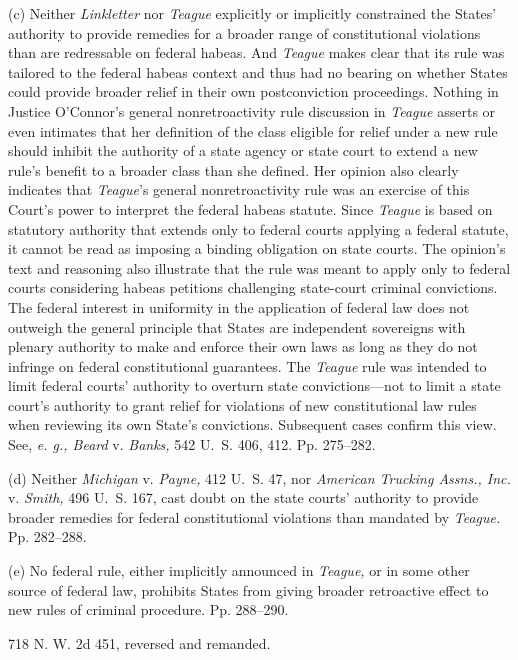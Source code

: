   (c) Neither \emph{Linkletter} nor \emph{Teague} explicitly or implicitly constrained the States' authority to provide remedies for a broader range of constitutional violations than are redressable on federal habeas. And \emph{Teague} makes clear that its rule was tailored to the federal habeas context and thus had no bearing on whether States could provide broader relief in their own postconviction proceedings. Nothing in Justice O'Connor's general nonretroactivity rule discussion in \emph{Teague} asserts or even intimates that her definition of the class eligible for relief under a new rule \newpage  should inhibit the authority of a state agency or state court to extend a new rule's benefit to a broader class than she defined. Her opinion also clearly indicates that \emph{Teague}'s general nonretroactivity rule was an exercise of this Court's power to interpret the federal habeas statute. Since \emph{Teague} is based on statutory authority that extends only to federal courts applying a federal statute, it cannot be read as imposing a binding obligation on state courts. The opinion's text and reasoning also illustrate that the rule was meant to apply only to federal courts considering habeas petitions challenging state-court criminal convictions. The federal interest in uniformity in the application of federal law does not outweigh the general principle that States are independent sovereigns with plenary authority to make and enforce their own laws as long as they do not infringe on federal constitutional guarantees. The \emph{Teague} rule was intended to limit federal courts' authority to overturn state convictions---not to limit a state court's authority to grant relief for violations of new constitutional law rules when reviewing its own State's convictions. Subsequent cases confirm this view. See, \emph{e. g., Beard} v. \emph{Banks,} 542 U.~S. 406, 412. Pp. 275--282.

  (d) Neither \emph{Michigan} v. \emph{Payne,} 412 U.~S. 47, nor \emph{American Trucking Assns., Inc.} v. \emph{Smith,} 496 U.~S. 167, cast doubt on the state courts' authority to provide broader remedies for federal constitutional violations than mandated by \emph{Teague.} Pp. 282--288.

  (e) No federal rule, either implicitly announced in \emph{Teague,} or in some other source of federal law, prohibits States from giving broader retroactive effect to new rules of criminal procedure. Pp. 288--290.

718 N. W. 2d 451, reversed and remanded.

